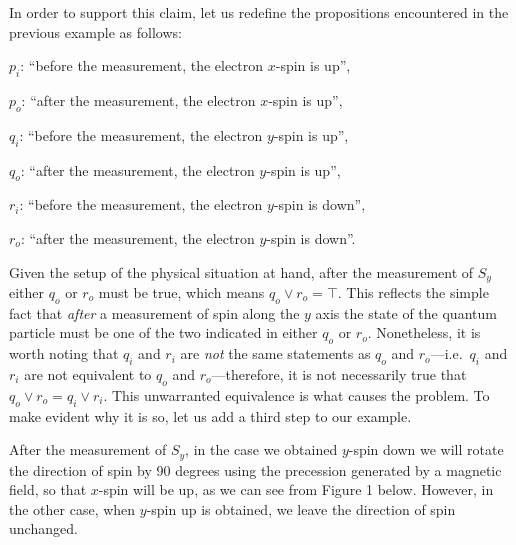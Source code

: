 \documentclass[11pt, executivepaper]{article}
\begin{document}
In order to support this claim, let us redefine the propositions encountered in the previous example as follows:
\begin{description}
	\item $p_i$: ``before the measurement, the electron $x$-spin is up'', 
	\item $p_o$: ``after the measurement, the electron $x$-spin is up'', 
	\item $q_i$: ``before the measurement, the electron $y$-spin is up'',
	\item $q_o$: ``after the measurement, the electron $y$-spin is up'',
	\item $r_i$: ``before the measurement, the electron $y$-spin is down'',
	\item $r_o$: ``after the measurement, the electron $y$-spin is down''.
\end{description}
\noindent Given the setup of the physical situation at hand, after the measurement of $S_y$ either $q_o$ or $r_o$ must be true, which means $q_o \vee r_o = \top$. This reflects the simple fact that \emph{after} a measurement of spin along the $y$ axis the state of the quantum particle must be one of the two indicated in either $q_o$ or $r_o$. Nonetheless, it is worth noting that $q_i$ and $r_i$ are \emph{not} the same statements as $q_o$ and $r_o$---i.e.\ $q_i$ and $r_i$ are not equivalent to $q_o$ and $r_o$---therefore, it is not necessarily true that $q_o \vee r_o = q_i \vee r_i$. This unwarranted equivalence is what causes the problem. To make evident why it is so, let us add a third step to our example. 

After the measurement of $S_y$, in the case we obtained $y$-spin down we will rotate the direction of spin by 90 degrees using the precession generated by a magnetic field, so that $x$-spin will be up, as we can see from Figure 1 below. However, in the other case, when $y$-spin up is obtained, we leave the direction of spin unchanged.
\end{document}
